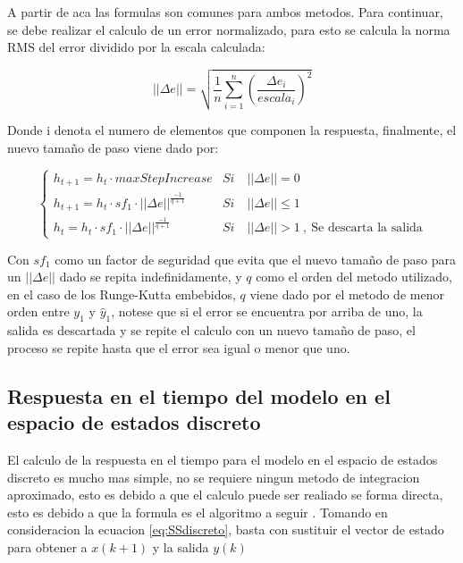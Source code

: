                 A partir de aca las formulas son comunes para ambos metodos. Para continuar, se debe realizar el calculo de un error normalizado, para esto se calcula la norma RMS del error dividido por la escala calculada:

                \begin{equation}\label{eq:ErrorNormalizado}
                    ||\Delta e|| = \sqrt{\frac{1}{n} \sum_{i=1}^{n} \left(\frac{\Delta e_i}{escala_i}\right)^2}
                \end{equation}

                Donde i denota el numero de elementos que componen la respuesta, finalmente, el nuevo tamaño de paso viene dado por:
                
                \begin{equation}
                    \begin{cases}
                        h_{t+1} = h_{t}\cdot maxStepIncrease & Si \quad ||\Delta e|| = 0\\
                        h_{t+1} = h_{t}\cdot sf_1 \cdot ||\Delta e||^{\frac{-1}{q+1}}  & Si \quad ||\Delta e|| \leq 1 \\
                        h_{t} = h_{t}\cdot sf_1 \cdot ||\Delta e||^{\frac{-1}{q+1}}  & Si \quad ||\Delta e|| > 1 \ ,\ \text{Se descarta la salida}
                    \end{cases}
                \end{equation}
                
                Con $sf_1$ como un factor de seguridad que evita que el nuevo tamaño de paso para un $||\Delta e||$ dado se repita indefinidamente, y $q$ como el orden del metodo utilizado, en el caso de los Runge-Kutta embebidos, $q$ viene dado por el metodo de menor orden entre $y_1$ y $\hat{y}_1$, notese que si el error se encuentra por arriba de uno, la salida es descartada y se repite el calculo con un nuevo tamaño de paso, el proceso se repite hasta que el error sea igual o menor que uno.
    
    \subsection{Respuesta en el tiempo del modelo en el espacio de estados discreto}
        
        El calculo de la respuesta en el tiempo para el modelo en el espacio de estados discreto es mucho mas simple, no se requiere ningun metodo de integracion aproximado, esto es debido a que el calculo puede ser realiado se forma directa, esto es debido a que la formula es el algoritmo a seguir \Parencite{haugen2005discrete}. Tomando en consideracion la ecuacion \cref{eq:SSdiscreto}, basta con sustituir el vector de estado para obtener a $x(k+1)$ y la salida $y(k)$
    
